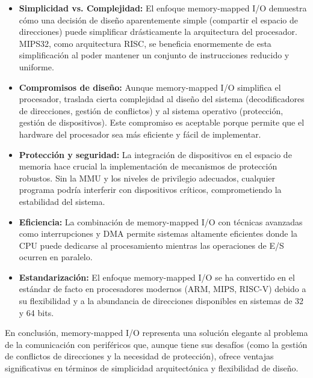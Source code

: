 \documentclass[12pt]{article}
\begin{document}
\begin{itemize}
	\item \textbf{Simplicidad vs. Complejidad:} El enfoque memory-mapped I/O demuestra cómo una decisión de diseño aparentemente simple (compartir el espacio de direcciones) puede simplificar drásticamente la arquitectura del procesador. MIPS32, como arquitectura RISC, se beneficia enormemente de esta simplificación al poder mantener un conjunto de instrucciones reducido y uniforme.
	
	\item \textbf{Compromisos de diseño:} Aunque memory-mapped I/O simplifica el procesador, traslada cierta complejidad al diseño del sistema (decodificadores de direcciones, gestión de conflictos) y al sistema operativo (protección, gestión de dispositivos). Este compromiso es aceptable porque permite que el hardware del procesador sea más eficiente y fácil de implementar.
	
	\item \textbf{Protección y seguridad:} La integración de dispositivos en el espacio de memoria hace crucial la implementación de mecanismos de protección robustos. Sin la MMU y los niveles de privilegio adecuados, cualquier programa podría interferir con dispositivos críticos, comprometiendo la estabilidad del sistema.
	
	\item \textbf{Eficiencia:} La combinación de memory-mapped I/O con técnicas avanzadas como interrupciones y DMA permite sistemas altamente eficientes donde la CPU puede dedicarse al procesamiento mientras las operaciones de E/S ocurren en paralelo.
	
	\item \textbf{Estandarización:} El enfoque memory-mapped I/O se ha convertido en el estándar de facto en procesadores modernos (ARM, MIPS, RISC-V) debido a su flexibilidad y a la abundancia de direcciones disponibles en sistemas de 32 y 64 bits.
\end{itemize}

En conclusión, memory-mapped I/O representa una solución elegante al problema de la comunicación con periféricos que, aunque tiene sus desafíos (como la gestión de conflictos de direcciones y la necesidad de protección), ofrece ventajas significativas en términos de simplicidad arquitectónica y flexibilidad de diseño.
\end{document}
